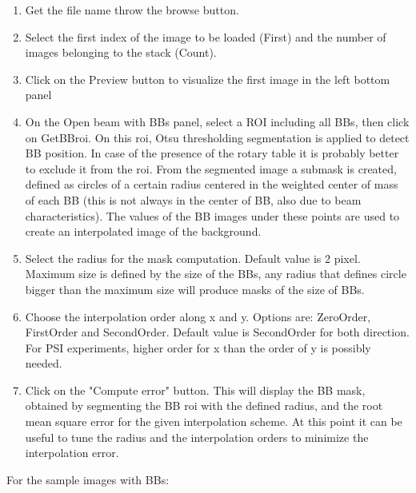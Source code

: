 \documentclass[a4paper]{scrreprt}
\begin{document}
\begin{enumerate}
\item Get the file name throw the browse button.
\item Select the first index of the image to be loaded (First) and the number of images belonging to the stack (Count).
\item Click on the Preview button to visualize the first image in the left bottom panel
\item On the Open beam with BBs panel, select a ROI including all BBs, then click on GetBBroi. On this roi, Otsu thresholding segmentation is applied to detect BB position. In case of the presence of the rotary table it is probably better to exclude it from the roi. From the segmented image a submask is created, defined as circles of a certain radius centered in the weighted center of mass of each BB (this is not always in the center of BB, also due to beam characteristics). The values of the BB images under these points are used to create an interpolated image of the background. 
\item Select the radius for the mask computation. Default value is 2 pixel. Maximum size is defined by the size of the BBs, any radius that defines circle bigger than the maximum size will produce masks of the size of BBs. 
\item Choose the interpolation order along x and y. Options are: ZeroOrder, FirstOrder and SecondOrder. Default value is SecondOrder for both direction. For PSI experiments, higher order for x than the order of y is possibly needed. 
\item Click on the "Compute error" button. This will display the BB mask, obtained by segmenting the BB roi with the defined radius, and the root mean square error for the given interpolation scheme. At this point it can be useful to tune the radius and the interpolation orders to minimize the interpolation error. 
\end{enumerate}
For the sample images with BBs:
\end{document}
